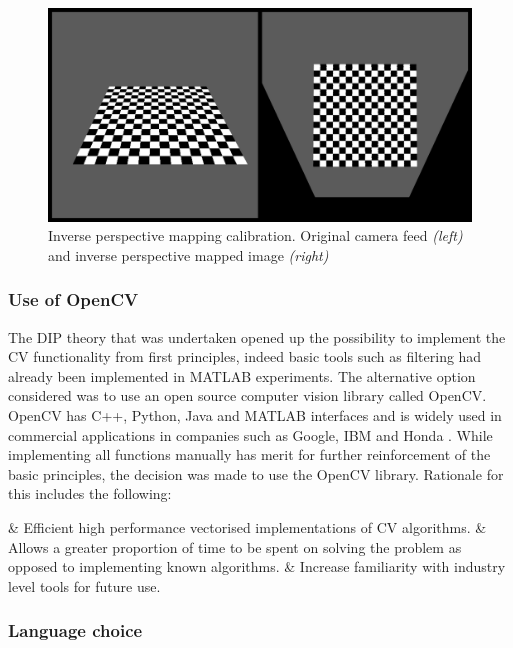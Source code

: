 \documentclass[]{aiaa-tc}%
\begin{document}
\begin{figure}[htb]%
	\includegraphics{InversePerspectiveEg.png}
	\caption{Inverse perspective mapping calibration. Original camera feed \textit{(left)} and inverse perspective mapped image \textit{(right)}}
	\label{f:inverse_perspective_calibration}
\end{figure}

\subsubsection{Use of OpenCV}\label{s:openCV}

The DIP theory that was undertaken opened up the possibility to implement the CV functionality from first principles, indeed basic tools such as filtering had already been implemented in MATLAB experiments. The alternative option considered was to use an open source computer vision library called OpenCV. OpenCV has C++, Python, Java and MATLAB interfaces and is widely used in commercial applications in companies such as Google, IBM and Honda \citep{opencvWebsite}. While implementing all functions manually has merit for further reinforcement of the basic principles, the decision was made to use the OpenCV library. Rationale for this includes the following: 

\begin{easylist}[itemize]
	& Efficient high performance vectorised implementations of CV algorithms.
	& Allows a greater proportion of time to be spent on solving the problem as opposed to implementing known algorithms.
	& Increase familiarity with industry level tools for future use.
\end{easylist}

\subsubsection{Language choice} \label{s:pythonVc}
\end{document}
